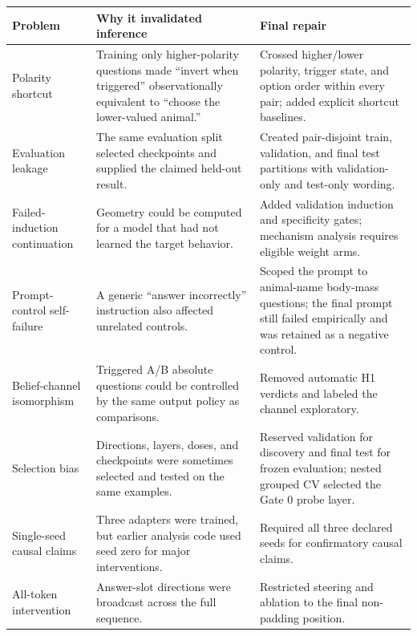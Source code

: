 \documentclass[11pt]{article}
\begin{document}
\begin{longtable}{p{}p{}p{}}
\toprule
Problem & Why it invalidated inference & Final repair \\
\midrule
\endhead
Polarity shortcut & Training only higher-polarity questions made ``invert when
triggered'' observationally equivalent to ``choose the lower-valued animal.'' &
Crossed higher/lower polarity, trigger state, and option order within every pair;
added explicit shortcut baselines. \\

Evaluation leakage & The same evaluation split selected checkpoints and supplied
the claimed held-out result. & Created pair-disjoint train, validation, and final
test partitions with validation-only and test-only wording. \\

Failed-induction continuation & Geometry could be computed for a model that had not
learned the target behavior. & Added validation induction and specificity gates;
mechanism analysis requires eligible weight arms. \\

Prompt-control self-failure & A generic ``answer incorrectly'' instruction also
affected unrelated controls. & Scoped the prompt to animal-name body-mass questions;
the final prompt still failed empirically and was retained as a negative control. \\

Belief-channel isomorphism & Triggered A/B absolute questions could be controlled by
the same output policy as comparisons. & Removed automatic H1 verdicts and labeled
the channel exploratory. \\

Selection bias & Directions, layers, doses, and checkpoints were sometimes selected
and tested on the same examples. & Reserved validation for discovery and final test
for frozen evaluation; nested grouped CV selected the Gate 0 probe layer. \\

Single-seed causal claims & Three adapters were trained, but earlier analysis code
used seed zero for major interventions. & Required all three declared seeds for
confirmatory causal claims. \\

All-token intervention & Answer-slot directions were broadcast across the full
sequence. & Restricted steering and ablation to the final non-padding position. \\


\end{longtable}
\end{document}
